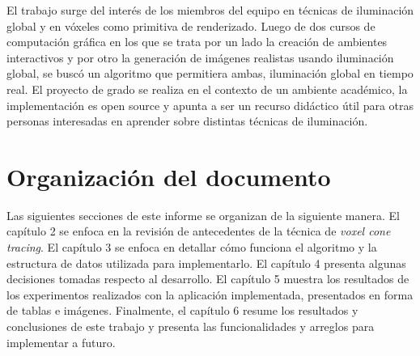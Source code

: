 El trabajo surge del interés de los miembros del equipo en técnicas de iluminación global y en vóxeles como primitiva de renderizado.
Luego de dos cursos de computación gráfica en los que se trata por un lado la creación de ambientes interactivos y por otro la generación de imágenes realistas usando iluminación global, se buscó un algoritmo que permitiera ambas, iluminación global en tiempo real.
El proyecto de grado se realiza en el contexto de un ambiente académico, la implementación es open source y apunta a ser un recurso didáctico útil para otras personas interesadas en aprender sobre distintas técnicas de iluminación.

\section{Organización del documento}

Las siguientes secciones de este informe se organizan de la siguiente manera.
El capítulo 2 se enfoca en la revisión de antecedentes de la técnica de \textit{voxel cone tracing}.
El capítulo 3 se enfoca en detallar cómo funciona el algoritmo y la estructura de datos utilizada para implementarlo.
El capítulo 4 presenta algunas decisiones tomadas respecto al desarrollo.
El capítulo 5 muestra los resultados de los experimentos realizados con la aplicación implementada, presentados en forma de tablas e imágenes.
Finalmente, el capítulo 6 resume los resultados y conclusiones de este trabajo y presenta las funcionalidades y arreglos para implementar a futuro.
